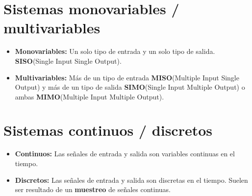 \documentclass[a4paper,12pt,numbers=noenddot]{scrreprt}
\begin{document}
    \section*{Sistemas monovariables / multivariables}
    \begin{itemize}
        \item \textbf{Monovariables:} Un solo tipo de entrada y un solo tipo de salida.
        \textbf{SISO}(Single Input Single Output).
        \item \textbf{Multivariables:} Más de un tipo de entrada \textbf{MISO}(Multiple Input 
        Single Output) y más de un tipo de salida \textbf{SIMO}(Single Input Multiple Output) o
        ambas \textbf{MIMO}(Multiple Input Multiple Output).
    \end{itemize}

    \section*{Sistemas continuos / discretos}
    \begin{itemize}
        \item \textbf{Continuos:} Las señales de entrada y salida son variables continuas en el tiempo.
        \item \textbf{Discretos:} Las señales de entrada y salida son discretas en el tiempo.
        Suelen ser resultado de un \textbf{muestreo} de señales continuas.
    \end{itemize}
\end{document}

